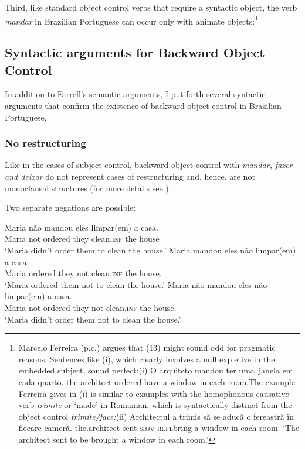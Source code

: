 \documentclass[output=paper]{langsci/langscibook}
\begin{document}
Third, like standard object control verbs that require a syntactic object, the verb \textit{mandar} in Brazilian Portuguese can occur only with animate objects:\footnote{Marcelo Ferreira (p.c.) argues that (13) might sound odd for pragmatic reasons. Sentences like (i), which clearly involves a null expletive in the~ embedded subject, sound perfect:(i)  O   arquiteto mandou   ter    uma~janela    em cada quarto.  the architect  ordered   have a      window in  each  room.The example Ferreira gives in (i) is similar to examples with the homophonous causative verb \textit{trimite} or ‘made’ in Romanian, which is syntactically distinct from the object control \textit{trimite/face:}(ii)    Architectul   a trimis să     se    aducă o fereastră în fiecare cameră.  the.architect sent       \textsc{sbjv refl}bring a window   in each    room.  ‘The architect sent to be brought a window in each room.’}

\z

\subsection{Syntactic arguments for Backward Object Control} %

In addition to Farrell’s semantic arguments, I put forth several syntactic arguments that confirm the existence of backward object control in Brazilian Portuguese.

\subsubsection{No restructuring}%

Like in the cases of subject control, backward object control with \textit{mandar, fazer and deixar}\textbf{ }do not represent cases of restructuring and, hence, are not monoclausal structures (for more details see \citealt{Cyrino2010}):

Two separate negations are possible:

\ea%
    \label{ex:moreno:14}
    \ea
    \gll Maria não   mandou   eles limpar(em)   a casa.\\
         Maria not   ordered   they clean.\textsc{inf}   the house\\
    \glt ‘Maria didn’t order them to clean the house.’
    \ex  
    \gll Maria mandou   eles não   limpar(em)   a casa.\\
         Maria ordered   they not   clean.\textsc{inf}   the house.\\
    \glt ‘Maria ordered them not  to clean  the house.’
    \ex  
    \gll Maria não   mandou   eles não limpar(em)   a casa.\\
         Maria  not   ordered   they not clean.\textsc{inf}   the house.\\
    \glt ‘Maria didn’t order them not to clean the house.’
    \z
\z
\end{document}
